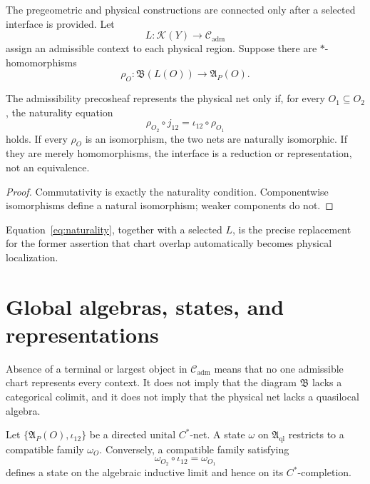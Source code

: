 \documentclass[11pt]{article}
\begin{document}
The pregeometric and physical constructions are connected only after a
selected interface is provided.  Let
\[
 L:\mathcal K(Y)\longrightarrow\mathcal C_{\mathrm{adm}}
\]
assign an admissible context to each physical region.  Suppose there are
$*$-homomorphisms
\[
 \rho_O:\mathfrak B(L(O))\longrightarrow\mathfrak A_P(O).
\]

\begin{proposition}\label{prop:naturality}
The admissibility precosheaf represents the physical net only if, for every
$O_1\subseteq O_2$, the naturality equation
\begin{equation}
 \rho_{O_2}\circ j_{12}
 =\iota_{12}\circ\rho_{O_1}
 \label{eq:naturality}
\end{equation}
holds.  If every $\rho_O$ is an isomorphism, the two nets are naturally
isomorphic.  If they are merely homomorphisms, the interface is a reduction or
representation, not an equivalence.
\end{proposition}

\begin{proof}
Commutativity is exactly the naturality condition.  Componentwise
isomorphisms define a natural isomorphism; weaker components do not.
\end{proof}

Equation~\eqref{eq:naturality}, together with a selected $L$, is the precise
replacement for the former assertion that chart overlap automatically becomes
physical localization.

\section{Global algebras, states, and representations}

Absence of a terminal or largest object in $\mathcal C_{\mathrm{adm}}$ means
that no one admissible chart represents every context.  It does not imply
that the diagram $\mathfrak B$ lacks a categorical colimit, and it does not
imply that the physical net lacks a quasilocal algebra.

\begin{proposition}
Let $\{\mathfrak A_P(O),\iota_{12}\}$ be a directed unital $C^*$-net.  A state
$\omega$ on $\mathfrak A_{\mathrm{ql}}$ restricts to a compatible family
$\omega_O$.  Conversely, a compatible family satisfying
\[
 \omega_{O_2}\circ\iota_{12}=\omega_{O_1}
\]
defines a state on the algebraic inductive limit and hence on its
$C^*$-completion.
\end{proposition}
\end{document}

